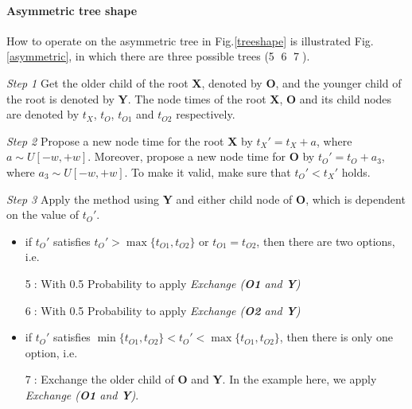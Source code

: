 \documentclass{bmcart}
\begin{document}
\paragraph*{Asymmetric tree shape}

How to operate on the asymmetric tree in Fig.\ref{treeshape} is illustrated Fig.\ref{asymmetric}, in which there are three possible trees (\textcircled5 \textcircled6 \textcircled7).

\emph{Step 1} Get the older child of the root \textbf{X}, denoted by \textbf{O}, and the younger child of the root is denoted by \textbf{Y}. The node times of the root \textbf{X},  \textbf{O} and its child nodes are denoted by ${t_X}$, ${t_O}$, ${t_{O1}}$ and ${t_{O2}}$ respectively. 

\emph{Step 2} Propose a new node time for the root \textbf{X} by ${t_X}' = {t_X} + a$, where $a \sim U[ - w, + w]$. Moreover, propose a new node time for \textbf{O} by ${t_O}' = {t_O} + {a_3}$, where ${a_3} \sim U[ - w, + w]$. To make it valid, make sure that ${t_O}' < {t_X}'$ holds.  

\emph{Step 3} Apply the method using \textbf{Y} and either child node of \textbf{O}, which is dependent on the value of ${t_O}'$.
\begin{itemize}
\item if ${t_O}'$ satisfies ${t_O}' > \max \{ {t_{O1}},{t_{O2}}\} $ or ${t_{O1}} = {t_{O2}}$, then there are two options, i.e.

\textcircled5: With 0.5 Probability to apply \textit{Exchange (\textbf{O1} and \textbf{Y})}

\textcircled6: With 0.5 Probability to apply \textit{Exchange (\textbf{O2} and \textbf{Y})}
\item if ${t_O}'$ satisfies $\min \{ {t_{O1}},{t_{O2}}\}  < {t_O}' < \max \{ {t_{O1}},{t_{O2}}\} $, then there is only one option, i.e.

\textcircled7: Exchange the older child of \textbf{O} and \textbf{Y}.  In the example here, we apply \textit{Exchange (\textbf{O1}  and \textbf{Y})}.
\end{itemize}
\end{document}
